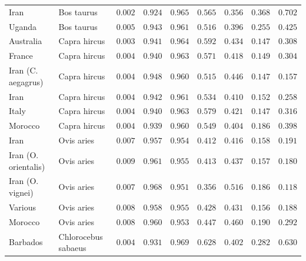 \documentclass[12pt]{article}
\begin{document}
\begin{center}
\begin{adjustbox}{width=\textwidth}
\begin{tabular}{||l|l|r||r|r||r|r||r|r||}
                Iran               & Bos taurus        & $ 0.002$ & $ 0.924$ & $ 0.965$ & $ 0.565$ & $ 0.356$ & $ 0.368$ & $ 0.702$ \\
                Uganda              & Bos taurus        & $ 0.005$ & $ 0.943$ & $ 0.961$ & $ 0.516$ & $ 0.396$ & $ 0.255$ & $ 0.425$ \\
                \rowcolor{LIGHTGREY} Australia            & Capra hircus        & $ 0.003$ & $ 0.941$ & $ 0.964$ & $ 0.592$ & $ 0.434$ & $ 0.147$ & $ 0.308$ \\
                \rowcolor{LIGHTGREY} France                                    & Capra hircus          & $ 0.004$ & $ 0.940$ & $ 0.963$ & $ 0.571$ & $ 0.418$ & $ 0.149$ & $ 0.304$ \\
                \rowcolor{LIGHTGREY} Iran (C. aegagrus)                    & Capra hircus          & $ 0.004$ & $ 0.948$ & $ 0.960$ & $ 0.515$ & $ 0.446$ & $ 0.147$ & $ 0.157$ \\
                \rowcolor{LIGHTGREY} Iran                        & Capra hircus          & $ 0.004$ & $ 0.942$ & $ 0.961$ & $ 0.534$ & $ 0.410$ & $ 0.152$ & $ 0.258$ \\
                \rowcolor{LIGHTGREY} Italy                                 & Capra hircus          & $ 0.004$ & $ 0.940$ & $ 0.963$ & $ 0.579$ & $ 0.421$ & $ 0.147$ & $ 0.316$ \\
                \rowcolor{LIGHTGREY} Morocco                                 & Capra hircus          & $ 0.004$ & $ 0.939$ & $ 0.960$ & $ 0.549$ & $ 0.404$ & $ 0.186$ & $ 0.398$ \\
                Iran           & Ovis aries & $ 0.007$ & $ 0.957$ & $ 0.954$ & $ 0.412$ & $ 0.416$ & $ 0.158$ & $ 0.191$ \\
                Iran (O. orientalis)  & Ovis aries & $ 0.009$ & $ 0.961$ & $ 0.955$ & $ 0.413$ & $ 0.437$ & $ 0.157$ & $ 0.180$ \\
                Iran (O. vignei)           & Ovis aries & $ 0.007$ & $ 0.968$ & $ 0.951$ & $ 0.356$ & $ 0.516$ & $ 0.186$ & $ 0.118$ \\
                Various             & Ovis aries & $ 0.008$ & $ 0.958$ & $ 0.955$ & $ 0.428$ & $ 0.431$ & $ 0.156$ & $ 0.188$ \\
                Morocco              & Ovis aries & $ 0.008$ & $ 0.960$ & $ 0.953$ & $ 0.447$ & $ 0.460$ & $ 0.190$ & $ 0.292$ \\
                \rowcolor{LIGHTGREY} Barbados              & Chlorocebus sabaeus & $ 0.004$ & $ 0.931$ & $ 0.969$ & $ 0.628$ & $ 0.402$ & $ 0.282$ & $ 0.630$ \\

\end{tabular}
\end{adjustbox}
\end{center}
\end{document}
